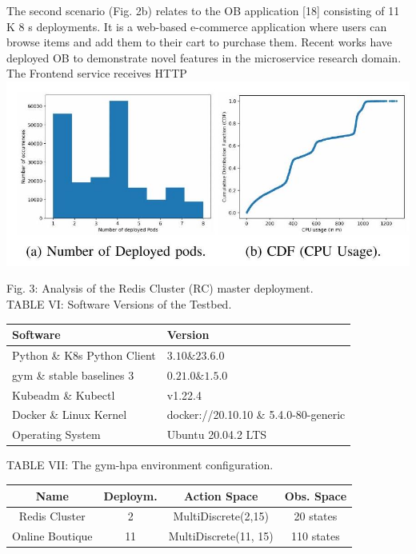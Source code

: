 \documentclass[10pt]{article}
\begin{document}
The second scenario (Fig. 2b) relates to the OB application [18] consisting of 11 K 8 s deployments. It is a web-based e-commerce application where users can browse items and add them to their cart to purchase them. Recent works have deployed OB to demonstrate novel features in the microservice research domain. The Frontend service receives HTTP\\
\includegraphics[max width=\textwidth, center]{2024_11_17_21ad14b6196e5740bf69g-7(2)}

Fig. 3: Analysis of the Redis Cluster (RC) master deployment.\\
TABLE VI: Software Versions of the Testbed.

\begin{center}
\begin{tabular}{|l|l|}
\hline
Software & Version \\
\hline
Python \& K8s Python Client & $3.10 \& 23.6 .0$ \\
gym \& stable baselines 3 & $0.21 .0 \& 1.5 .0$ \\
Kubeadm \& Kubectl & v1.22.4 \\
Docker \& Linux Kernel & docker://20.10.10 \& 5.4.0-80-generic \\
Operating System & Ubuntu 20.04.2 LTS \\
\hline
\end{tabular}
\end{center}

TABLE VII: The gym-hpa environment configuration.

\begin{center}
\begin{tabular}{|c|c|c|c|}
\hline
Name & Deploym. & Action Space & Obs. Space \\
\hline
Redis Cluster & 2 & MultiDiscrete(2,15) & 20 states \\
\hline
Online Boutique & 11 & MultiDiscrete(11, 15) & 110 states \\
\hline
\end{tabular}
\end{center}
\end{document}
